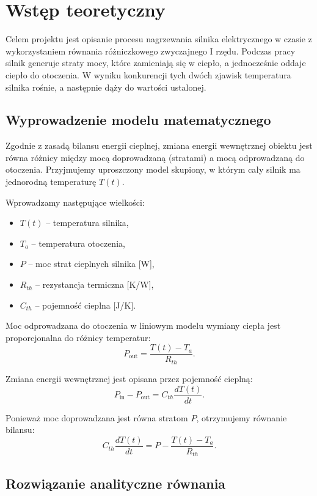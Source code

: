 \documentclass[a4paper,12pt]{article}
\begin{document}
	\section{Wstęp teoretyczny}
	
	Celem projektu jest opisanie procesu nagrzewania silnika elektrycznego w czasie
	z wykorzystaniem równania różniczkowego zwyczajnego I rzędu.
	Podczas pracy silnik generuje straty mocy, które zamieniają się w ciepło,
	a jednocześnie oddaje ciepło do otoczenia. W wyniku konkurencji tych dwóch
	zjawisk temperatura silnika rośnie, a następnie dąży do wartości ustalonej.
	
	\subsection{Wyprowadzenie modelu matematycznego}
	
	Zgodnie z zasadą bilansu energii cieplnej, zmiana energii wewnętrznej obiektu
	jest równa różnicy między mocą doprowadzaną (stratami) a mocą odprowadzaną
	do otoczenia. Przyjmujemy uproszczony model skupiony, w którym cały silnik
	ma jednorodną temperaturę $T(t)$.
	
	Wprowadzamy następujące wielkości:
	\begin{itemize}
		\item $T(t)$ -- temperatura silnika,
		\item $T_a$ -- temperatura otoczenia,
		\item $P$ -- moc strat cieplnych silnika [W],
		\item $R_{th}$ -- rezystancja termiczna [K/W],
		\item $C_{th}$ -- pojemność cieplna [J/K].
	\end{itemize}
	
	Moc odprowadzana do otoczenia w liniowym modelu wymiany ciepła jest proporcjonalna
	do różnicy temperatur:
	\[
	P_{\text{out}} = \frac{T(t)-T_a}{R_{th}}.
	\]
	
	Zmiana energii wewnętrznej jest opisana przez pojemność cieplną:
	\[
	P_{\text{in}} - P_{\text{out}} = C_{th}\frac{dT(t)}{dt}.
	\]
	
	Ponieważ moc doprowadzana jest równa stratom $P$, otrzymujemy równanie bilansu:
	\[
	C_{th}\frac{dT(t)}{dt} = P - \frac{T(t)-T_a}{R_{th}}.
	\]
	
	\newpage
	
	\subsection{Rozwiązanie analityczne równania}
	
\end{document}
